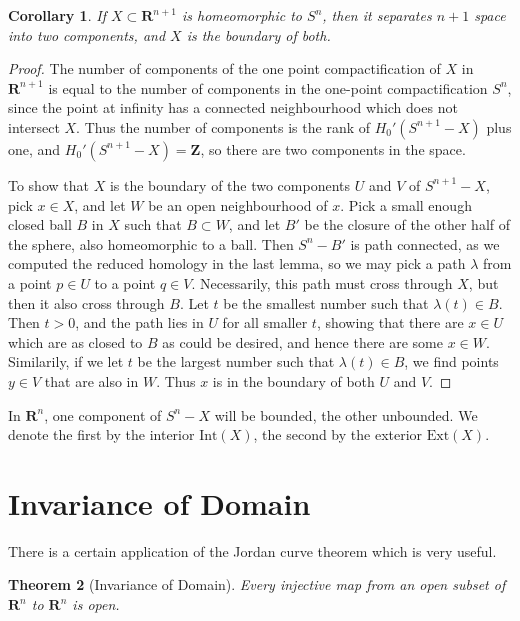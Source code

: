 \documentclass{article}
\theoremstyle{plain}
\newtheorem{theorem}{Theorem}
\newtheorem{corollary}[theorem]{Corollary}
\begin{document}
\begin{corollary}
    If $X \subset \mathbf{R}^{n+1}$ is homeomorphic to $S^n$, then it separates $n+1$ space into two components, and $X$ is the boundary of both.
\end{corollary}
\begin{proof}
    The number of components of the one point compactification of $X$ in $\mathbf{R}^{n+1}$ is equal to the number of components in the one-point compactification $S^n$, since the point at infinity has a connected neighbourhood which does not intersect $X$. Thus the number of components is the rank of $H_0'(S^{n+1} - X)$ plus one, and $H_0'(S^{n+1} - X) = \mathbf{Z}$, so there are two components in the space.

    To show that $X$ is the boundary of the two components $U$ and $V$ of $S^{n+1} - X$, pick $x \in X$, and let $W$ be an open neighbourhood of $x$. Pick a small enough closed ball $B$ in $X$ such that $B \subset W$, and let $B'$ be the closure of the other half of the sphere, also homeomorphic to a ball. Then $S^n - B'$ is path connected, as we computed the reduced homology in the last lemma, so we may pick a path $\lambda$ from a point $p \in U$ to a point $q \in V$. Necessarily, this path must cross through $X$, but then it also cross through $B$. Let $t$ be the smallest number such that $\lambda(t) \in B$. Then $t > 0$, and the path lies in $U$ for all smaller $t$, showing that there are $x \in U$ which are as closed to $B$ as could be desired, and hence there are some $x \in W$. Similarily, if we let $t$ be the largest number such that $\lambda(t) \in B$, we find points $y \in V$ that are also in $W$. Thus $x$ is in the boundary of both $U$ and $V$.
\end{proof}

In $\mathbf{R}^n$, one component of $S^n - X$ will be bounded, the other unbounded. We denote the first by the interior $\text{Int}(X)$, the second by the exterior $\text{Ext}(X)$.

\section{Invariance of Domain}

There is a certain application of the Jordan curve theorem which is very useful.

\begin{theorem}[Invariance of Domain]
    Every injective map from an open subset of $\mathbf{R}^n$ to $\mathbf{R}^n$ is open.
\end{theorem}
\end{document}
